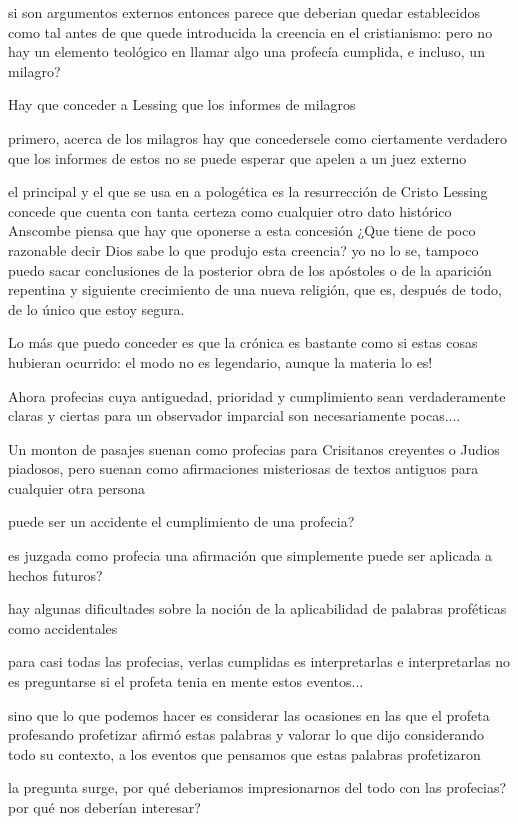 si son argumentos externos entonces parece que deberian quedar establecidos como
tal antes de que quede introducida la creencia en el cristianismo:
pero no hay un elemento teológico en llamar algo una profecía cumplida, e
incluso, un milagro?

Hay que conceder a Lessing que los informes de milagros

primero, acerca de los milagros
hay que concedersele como ciertamente verdadero que los informes de estos no se
puede esperar que apelen a un juez externo

el principal y el que se usa en a pologética es la resurrección de Cristo
Lessing concede que cuenta con tanta certeza como cualquier otro dato histórico
Anscombe piensa que hay que oponerse a esta concesión ¿Que tiene de poco
razonable decir Dios sabe lo que produjo esta creencia? yo no lo se, tampoco
puedo sacar conclusiones de la posterior obra de los apóstoles o de la aparición
repentina y siguiente crecimiento de una nueva religión, que es, después de
todo, de lo único que estoy segura.

Lo más que puedo conceder es que la crónica es bastante como si estas cosas
hubieran ocurrido: el modo no es legendario, aunque la materia lo es!

Ahora profecias cuya antiguedad, prioridad y cumplimiento sean verdaderamente
claras y ciertas para un observador imparcial son necesariamente pocas....

Un monton de pasajes suenan como profecias para Crisitanos creyentes o Judios
piadosos, pero suenan como afirmaciones misteriosas de textos antiguos para
cualquier otra persona

puede ser un accidente el cumplimiento de una profecia?

es juzgada como profecia una afirmación que simplemente puede ser aplicada a
hechos futuros?

hay algunas dificultades sobre la noción de la aplicabilidad de palabras
proféticas como accidentales

para casi todas las profecias, verlas cumplidas es interpretarlas e
interpretarlas no es preguntarse si el profeta tenia en mente estos eventos...

sino que lo que podemos hacer es considerar las ocasiones en las que el profeta
profesando profetizar afirmó estas palabras y valorar lo que dijo considerando
todo su contexto, a los eventos que pensamos que estas palabras profetizaron

la pregunta surge, por qué deberiamos impresionarnos del todo con las profecias?
por qué nos deberían interesar?

